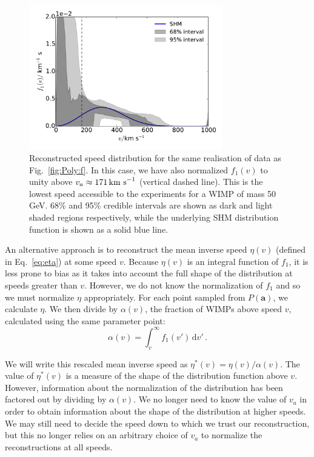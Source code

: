 \begin{figure}[t]
\centering
  \includegraphics[width=0.75\textwidth]{Poly/f_SHM_scaled_line.pdf}
  \caption{Reconstructed speed distribution for the same realisation of data as Fig.~\ref{fig:Poly:f}. In this case, we have also normalized $f_1(v)$ to unity above $v_a \approx 171 \,\textrm{km s}^{-1}$ (vertical dashed line). This is the lowest speed accessible to the experiments for a WIMP of mass 50 GeV. 68\% and 95\% credible intervals are shown as dark and light shaded regions respectively, while the underlying SHM distribution function is shown as a solid blue line.}
  \label{fig:Poly:f_scaled}
\end{figure}

An alternative approach is to reconstruct the mean inverse speed $\eta(v)$ (defined in Eq.~\ref{eq:eta}) at some speed $v$. Because $\eta(v)$ is an integral function of $f_1$, it is less prone to bias as it takes into account the full shape of the distribution at speeds greater than $v$. However, we do not know the normalization of $f_1$ and so we must normalize $\eta$ appropriately. For each point sampled from $P(\textbf{a})$, we calculate $\eta$. We then divide by $\alpha(v)$, the fraction of WIMPs above speed $v$, calculated using the same parameter point:
\begin{equation}
\label{eq:alpha}
\alpha(v) = \int_{v}^{\infty} f_1(v') \, \textrm{d}v'\,.
\end{equation}

We will write this rescaled mean inverse speed as $\eta^*(v) = \eta(v)/\alpha(v)$. The value of $\eta^*(v)$ is a measure of the shape of the distribution function above $v$. However, information about the normalization of the distribution has been factored out by dividing by $\alpha(v)$. We no longer need to know the value of $v_a$ in order to obtain information about the shape of the distribution at higher speeds. We may still need to decide the speed down to which we trust our reconstruction, but this no longer relies on an arbitrary choice of $v_a$ to normalize the reconstructions at all speeds.

